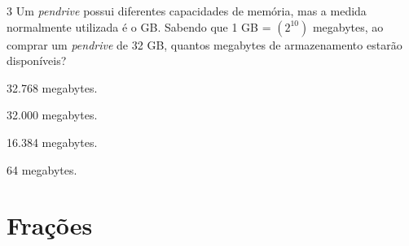 






\num{3} Um \textit{pendrive} possui diferentes capacidades de memória, mas a medida
normalmente utilizada é o GB. Sabendo que 1 GB = $(2^{10})$ megabytes,
ao comprar um \textit{pendrive} de 32 GB, quantos megabytes de armazenamento
estarão disponíveis?

\begin{escolha}[itemsep=0pt]
\item 32.768 megabytes.
\item 32.000 megabytes.
\item 16.384 megabytes.
\item 64 megabytes.
\end{escolha}






\chapter{Frações}

